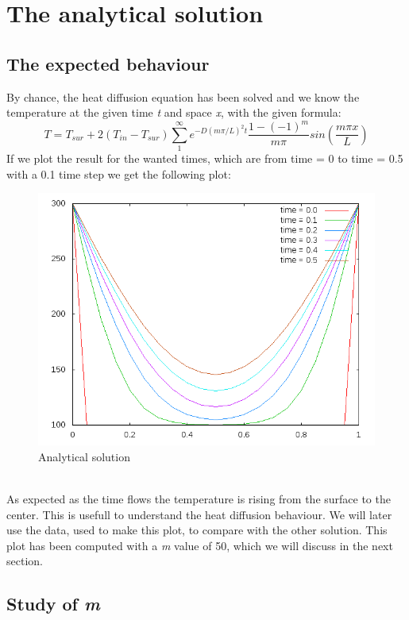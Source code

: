 \documentclass[12pt, a4paper]{report}
\begin{document}
\tableofcontents


\chapter{The analytical solution}
\section{The expected behaviour}
By chance, the heat diffusion equation has been solved and we know the temperature at the given time \textit{t} and space \textit{x}, with the given formula: \begin{equation}
T = T_{sur} + 2(T_{in} - T_{sur})\sum_{1}^{\infty}e^{-D(m\pi/L)^{2}t}\frac{1-(-1)^{m}}{m\pi}sin(\frac{m\pi x}{L})
\end{equation}
If we  plot the result for the wanted times, which are from time = 0 to time = 0.5 with a 0.1 time step we get the following plot:
\begin{figure}[h]
\centering
\includegraphics[scale=0.6]{Analytic.png}
\caption{Analytical solution}
\end{figure}
\\
As expected as the time flows the temperature is rising from the surface to the center. This is usefull to understand the heat diffusion behaviour. We will later use the data, used to make this plot, to compare with the other solution. This plot has been computed with a \textit{m} value of 50, which we will discuss in the next section.


\section{Study of \textit{m}}
\end{document}
